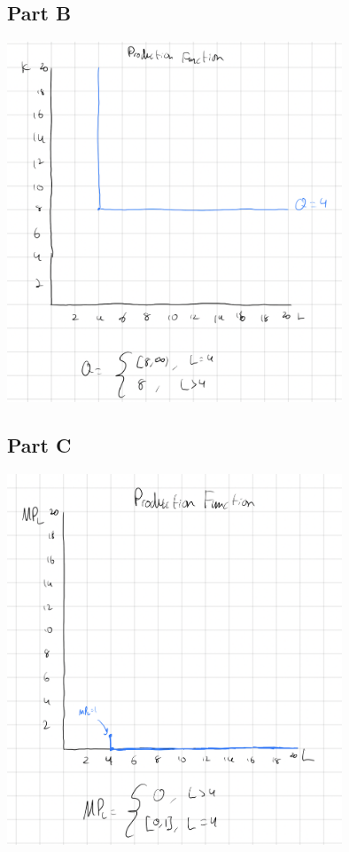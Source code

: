 \documentclass[8pt]{extarticle}
\begin{document}
{\subsection*{Part B}
\begin{center}
	\includegraphics[width=10cm]{HW6Q3B}
\end{center}
\subsection*{Part C}
\begin{center}
	\includegraphics[width=10cm]{HW6Q3C}
\end{center}
}
\end{document}
